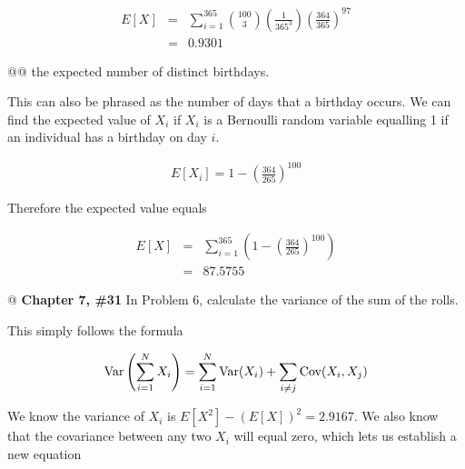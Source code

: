 \documentclass[11pt]{article}\usepackage[]{graphicx}\usepackage[]{xcolor}
\begin{document}
\begin{easylist}[enumerate]
    \begin{equation*}
        \begin{aligned}
            E[X] &=& \sum_{i=1}^{365} {100 \choose 3} \left( \frac{1}{365^3} \right) {\left( \frac{364}{365} \right)}^{97}\\
            &=& 0.9301
        \end{aligned}
    \end{equation*}

    @@ the expected number of distinct birthdays.\newline

    This can also be phrased as the number of days that a birthday occurs. We can find the expected value of $X_i$ if
    $X_i$ is a Bernoulli random variable equalling 1 if an individual has a birthday on day $i$.

    \begin{equation*}
        \begin{aligned}
            E[X_i] = 1 - {\left( \frac{364}{265} \right)}^{100}
        \end{aligned}
    \end{equation*}

    Therefore the expected value equals

    \begin{equation*}
        \begin{aligned}
            E[X] &=& \sum_{i=1}^{365} \left( 1 - {\left( \frac{364}{265} \right)}^{100}\right)\\
            &=& 87.5755
        \end{aligned}
    \end{equation*}

    @ \textbf{Chapter 7, \#31} In Problem 6, calculate the variance of the sum of the rolls.\newline

    This simply follows the formula

    \begin{equation*}
        \begin{aligned}
            \text{Var}\left( \sum_{i=1}^N X_i \right) = \sum_{i=1}^N \text{Var}(X_i) + \sum_{i\neq j} \text{Cov}(X_i, X_j)
        \end{aligned}
    \end{equation*}

    We know the variance of $X_i$ is $E[X^2] - \left( E[X] \right)^2 = 2.9167$. We also know that the covariance between any two $X_i$ will equal zero, which lets us establish a new
    equation


\end{easylist}
\end{document}
